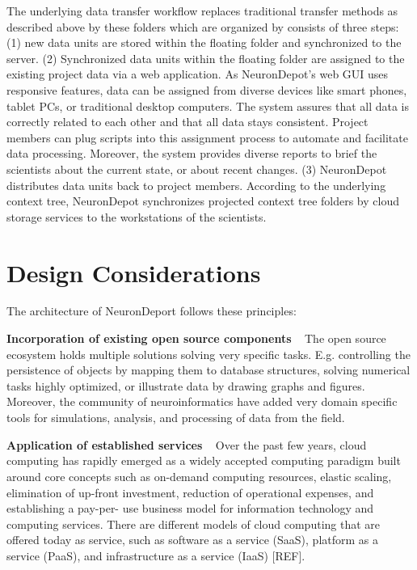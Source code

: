 \documentclass{frontiersSCNS} %
\begin{document}
The underlying data transfer workflow replaces traditional transfer methods as
described above by these folders which are organized by consists of three
steps: (1) new data units are stored within the floating folder and
synchronized to the server. (2) Synchronized data units within the floating
folder are assigned to the existing project data via a web application. As
NeuronDepot's web GUI uses responsive features, data can be assigned from
diverse devices like smart phones, tablet PCs, or traditional desktop
computers. The system assures that all data is correctly related to each other
and that all data stays consistent. Project members can plug scripts into this
assignment process to automate and facilitate data processing. Moreover, the
system provides diverse reports to brief the scientists about the current
state, or about recent changes. (3) NeuronDepot distributes data units back to
project members. According to the underlying context tree, NeuronDepot
synchronizes projected context tree folders by cloud storage services to the
workstations of the scientists.


\section{Design Considerations}
The architecture of NeuronDeport follows these principles:

\textbf{Incorporation of existing open source components} \texttt{  } The open source ecosystem holds multiple solutions solving very specific tasks.
E.g. controlling the persistence of objects by mapping them to database
structures, solving numerical tasks highly optimized, or illustrate data by
drawing graphs and figures. Moreover, the community of neuroinformatics have
added  very domain specific tools for simulations, analysis, and processing of
data from the field.

\textbf{Application of established services} \texttt{  } Over the past few
years, cloud computing has rapidly emerged as a widely accepted computing
paradigm built around core concepts such as on-demand computing resources,
elastic scaling, elimination of up-front investment, reduction of operational
expenses, and establishing a pay-per- use business model for information
technology and computing services. There are different models of cloud
computing that are offered today as service, such as software as a service
(SaaS), platform as a service (PaaS), and infrastructure as a service (IaaS)
[REF].
\end{document}
